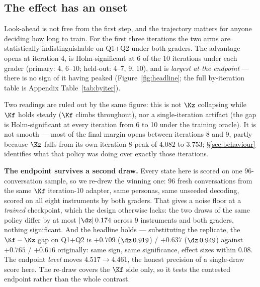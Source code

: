 \subsection{The effect has an onset}

Look-ahead is not free from the first step, and the trajectory matters for anyone deciding how long
to train. For the first three iterations the two arms are statistically indistinguishable on Q1+Q2
under both graders. The advantage opens at iteration 4, is Holm-significant at 6 of the 10
iterations under each grader (primary: 4, 6--10; held-out: 4--7, 9, 10), and is \emph{largest at
the endpoint} --- there is no sign of it having peaked (Figure~\ref{fig:headline}; the full
by-iteration table is Appendix Table~\ref{tab:byiter}).

Two readings are ruled out by the same figure: this is not $\Kz$ collapsing while $\Kf$ holds
steady ($\Kf$ climbs throughout), nor a single-iteration artifact (the gap is Holm-significant at
every iteration from 6 to 10 under the training oracle). It is not smooth --- most of the final
margin opens between iterations 8 and 9, partly because $\Kz$ falls from its own iteration-8 peak
of $4.082$ to $3.753$; \S\ref{sec:behaviour} identifies what that policy was doing over exactly
those iterations.

\textbf{The endpoint survives a second draw.} Every state here is scored on one 96-conversation
sample, so we re-drew the winning one: 96 fresh conversations from the same $\Kf$ iteration-10
adapter, same personas, same unseeded decoding, scored on all eight instruments by both graders.
That gives a noise floor at a \emph{trained} checkpoint, which the design otherwise lacks: the two
draws of the same policy differ by at most $|\dz|\,0.174$ across 9 instruments and both graders,
nothing significant. And the headline holds --- substituting the replicate, the $\Kf-\Kz$ gap on
Q1+Q2 is $+0.709$ ($\dz\,0.919$) / $+0.637$ ($\dz\,0.949$) against $+0.765$ / $+0.616$ originally:
same sign, same significance, effect sizes within $0.08$. The endpoint \emph{level} moves
$4.517 \rightarrow 4.461$, the honest precision of a single-draw score here. The re-draw covers
the $\Kf$ side only, so it tests the contested endpoint rather than the whole contrast.
